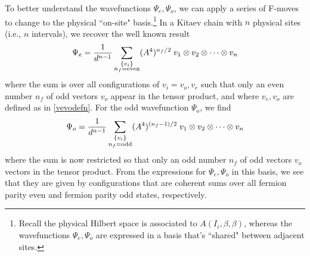 
To better understand the wavefunctions $\Psi_e,\Psi_o$, we can apply a series of F-moves to change to the physical ``on-site" basis.\footnote{Recall the physical Hilbert space is associated to $A(I_i,\beta, \beta)$, 
whereas the wavefunctions $\Psi_e,\Psi_o$ are expressed in a basis that's ``shared" between adjacent sites.}
In a Kitaev chain with $n$ physical sites (i.e., $n$ intervals), 
we recover the well known result
\begin{align}
\Psi_e = \frac{1}{d^{n-1}} \sum_{\substack{ \{ v_i\} \\  n_f = \text{even} }} (A^4)^{n_f/2} \; v_1 \otimes v_2 \otimes \cdots \otimes v_n
\end{align}
where the sum is over all configurations of $v_i =v_o,v_e$ such that only an even number $n_f$ of odd vectors $v_o$ appear 
in the tensor product, and where $v_e,v_o$ are defined as in \eqref{vevodefn}.
For the odd wavefunction $\Psi_o$, we find 
\begin{align}
\Psi_o = \frac{1}{d^{n-1}}\sum_{\substack{ \{ v_i\} \\  n_f = \text{odd} }}  (A^4)^{(n_f-1)/2}\; v_1 \otimes v_2 \otimes \cdots \otimes v_n
\end{align}
where the sum is now restricted so that only an odd number $n_f$ of odd vectors $v_o$ vectors in the tensor product.
From the expressions for $\Psi_e,\Psi_o$ in this basis, we see that they are given by configurations 
that are coherent sums over all fermion parity even and fermion parity odd states, respectively.  

